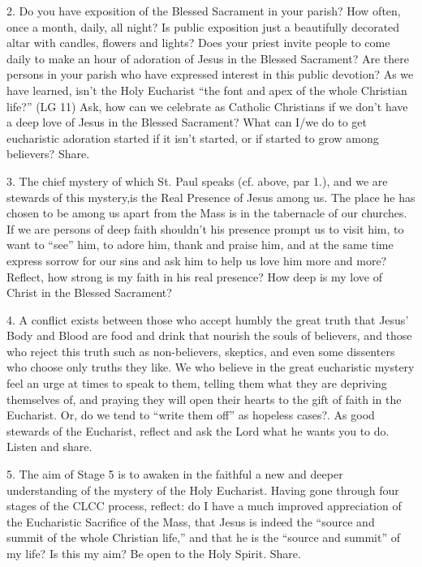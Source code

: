 \documentclass[oneside]{book}
\begin{document}
2. Do you have exposition of the Blessed Sacrament in your parish? How often,
once a month, daily, all night? Is public exposition just a beautifully
decorated altar with candles, flowers and lights? Does your priest invite people
to come daily to make an hour of adoration of Jesus in the Blessed Sacrament?
Are there persons in your parish who have expressed interest in this public
devotion? As we have learned, isn't the Holy Eucharist ``the font and apex of
the whole Christian life?'' (LG 11) Ask, how can we celebrate as Catholic
Christians if we don't have a deep love of Jesus in the Blessed Sacrament? What
can I/we do to get eucharistic adoration started if it isn't started, or if
started to grow among believers? Share.

3. The chief mystery of which St. Paul speaks (cf. above, par 1.), and we are
stewards of this mystery,is the Real Presence of Jesus among us. The place he
has chosen to be among us apart from the Mass is in the tabernacle of our
churches. If we are persons of deep faith shouldn't his presence prompt us to
visit him, to want to ``see'' him, to adore him, thank and praise him, and at
the same time express sorrow for our sins and ask him to help us love him more
and more? Reflect, how strong is my faith in his real presence? How deep is my
love of Christ in the Blessed Sacrament?

4. A conflict exists between those who accept humbly the great truth that Jesus'
Body and Blood are food and drink that nourish the souls of believers, and those
who reject this truth such as non-believers, skeptics, and even some dissenters
who choose only truths they like. We who believe in the great eucharistic
mystery feel an urge at times to speak to them, telling them what they are
depriving themselves of, and praying they will open their hearts to the gift of
faith in the Eucharist. Or, do we tend to ``write them off'' as hopeless
cases?. As good stewards of the Eucharist, reflect and ask the Lord what he
wants you to do. Listen and share.

5. The aim of Stage 5 is to awaken in the faithful a new and deeper
understanding of the mystery of the Holy Eucharist. Having gone through four
stages of the CLCC process, reflect: do I have a much improved appreciation of
the Eucharistic Sacrifice of the Mass, that Jesus is indeed the ``source and
summit of the whole Christian life,'' and that he is the ``source and summit''
of my life? Is this my aim? Be open to the Holy Spirit. Share.
\end{document}
